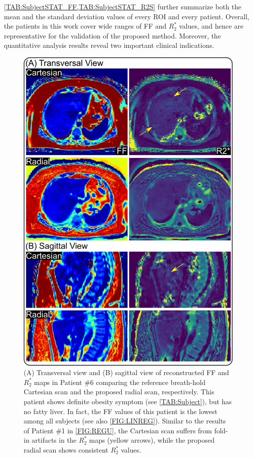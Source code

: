 \documentclass[journal,twoside,web]{ieeecolor}
\begin{document}
\cref{TAB:SubjectSTAT_FF,TAB:SubjectSTAT_R2S} further summarize 
both the mean and the standard deviation values of every ROI and every patient. 
Overall, the patients in this work cover wide ranges of FF and $R_2^*$ values, 
and hence are representative for the validation of the proposed method. 
Moreover, the quantitative analysis results reveal two important clinical indications.


\begin{figure}
	\centering
	\includegraphics[width=\columnwidth]{../../figures/tan9.pdf}
	\caption{(A) Transversal view and (B) sagittal view 
		of reconstructed FF and $R_2^*$ maps in Patient \#6 
		comparing the reference breath-hold Cartesian scan and 
		the proposed radial scan, respectively. 
		This patient shows definite obesity symptom 
		(see \cref{TAB:Subject}), but has no fatty liver. 
		In fact, the FF values of this patient is the lowest 
		among all subjects (see also \cref{FIG:LINREG}). 
		Similar to the results of Patient \#1 in \cref{FIG:REGU}, 
		the Cartesian scan suffers from fold-in artifacts in the $R_2^*$ maps 
		(yellow arrows), while the proposed radial scan shows consistent $R_2^*$ values.}
	\label{FIG:LPDFF}
\end{figure}
\end{document}
